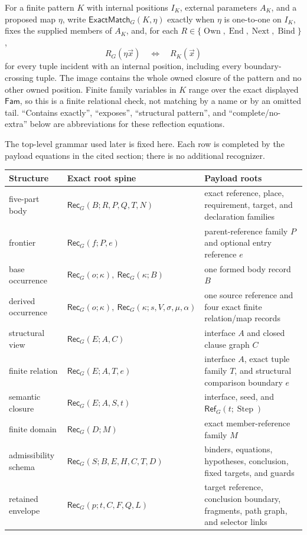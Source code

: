 \documentclass[11pt,twoside]{article}
\newcommand{\Rec}{\mathsf{Rec}}
\newcommand{\Fam}{\mathsf{Fam}}
\newcommand{\RefPos}{\mathsf{Ref}}
\newcommand{\ExactMatch}{\mathsf{ExactMatch}}
\begin{document}
For a finite pattern \(K\) with internal positions \(I_K\), external parameters
\(A_K\), and a proposed map \(\eta\), write
\(\ExactMatch_G(K,\eta)\) exactly when \(\eta\) is one-to-one on \(I_K\), fixes
the supplied members of \(A_K\), and, for each
\(R\in\{\operatorname{Own},\operatorname{End},\operatorname{Next},
\operatorname{Bind}\}\),
\[
 R_G(\eta\vec x)\quad\Longleftrightarrow\quad R_K(\vec x)
\]
for every tuple incident with an internal position, including every
boundary-crossing tuple.  The image contains the whole owned closure of the pattern
and no other owned position.  Finite family variables in \(K\) range over the
exact displayed \(\Fam\), so this is a finite relational check, not matching by a
name or by an omitted tail.  ``Contains exactly'', ``exposes'', ``structural
pattern'', and ``complete/no-extra'' below are abbreviations for these
reflection equations.

The top-level grammar used later is fixed here.  Each row is completed by the
payload equations in the cited section; there is no additional recognizer.

\begin{center}
\begin{tabularx}{0.98\textwidth}{@{}>{\raggedright\arraybackslash}p{}
                                      >{\raggedright\arraybackslash}p{}
                                      X@{}}
\toprule
Structure & Exact root spine & Payload roots\\
\midrule
five-part body & \(\Rec_G(B;R,P,Q,T,N)\) & exact reference, place,
requirement, target, and declaration families\\
frontier & \(\Rec_G(f;P,e)\) & parent-reference family \(P\) and optional
entry reference \(e\)\\
base occurrence & \(\Rec_G(o;\kappa),\ \Rec_G(\kappa;B)\) & one formed body
record \(B\)\\
derived occurrence &
\(\Rec_G(o;\kappa),\ \Rec_G(\kappa;s,V,\sigma,\mu,\alpha)\) & one source
reference and four exact finite relation/map records\\
structural view & \(\Rec_G(E;A,C)\) & interface \(A\) and closed clause graph
\(C\)\\
finite relation & \(\Rec_G(E;A,T,e)\) & interface \(A\), exact tuple family
\(T\), and structural comparison boundary \(e\)\\
semantic closure & \(\Rec_G(E;A,S,t)\) & interface, seed, and
\(\RefPos_G(t;\operatorname{Step})\)\\
finite domain & \(\Rec_G(D;M)\) & exact member-reference family \(M\)\\
admissibility schema & \(\Rec_G(S;B,E,H,C,T,D)\) & binders, equations,
hypotheses, conclusion, fixed targets, and guards\\
retained envelope & \(\Rec_G(p;t,C,F,Q,L)\) & target reference, conclusion
boundary, fragments, path graph, and selector links\\
\bottomrule
\end{tabularx}
\end{center}
\end{document}
